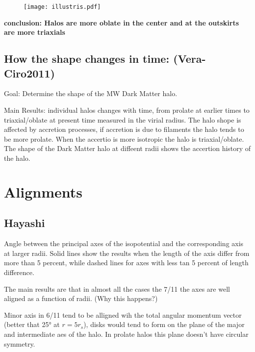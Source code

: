 \documentclass[12pt]{article}
\begin{document}
\begin{figure}[H]
\texttt{[image: illustris.pdf]}
\end{figure}

\textbf{conclusion: Halos are more oblate in the center and at the outskirts are more triaxials}


\subsection{How the shape changes in time: (Vera-Ciro2011)}

Goal:  Determine the shape of the MW Dark Matter halo.

Main Results: individual halos changes with time, from prolate at earlier times 
to triaxial/oblate at present time measured in the virial radius. The halo 
shope is affected by accretion processes, if accretion is due to filaments
the halo tends to be more prolate. When the accertio is more isotropic the halo
is triaxial/oblate. The shape of the Dark Matter halo at diffeent radii shows 
the accertion history of the halo.    






\section{Alignments}

\subsection{Hayashi}

Angle between the principal axes of the isopotential and the corresponding
axis at larger radii. Solid lines show the results when the length of the 
axis differ from more than 5 percent, while dashed lines for axes with 
less tan 5 percent of length difference.

The main results are that in almost all the cases the 7/11 the axes are 
well aligned as a function of radii. (Why this happens?)

Minor axis in 6/11 tend to be alligned wih the total angular momentum vector 
(better that 25° at $r=5r_s$), disks would tend to form on the plane of 
the major and intermediate aes of the halo. In prolate halos this plane
doesn't have circular symmetry.
\end{document}
